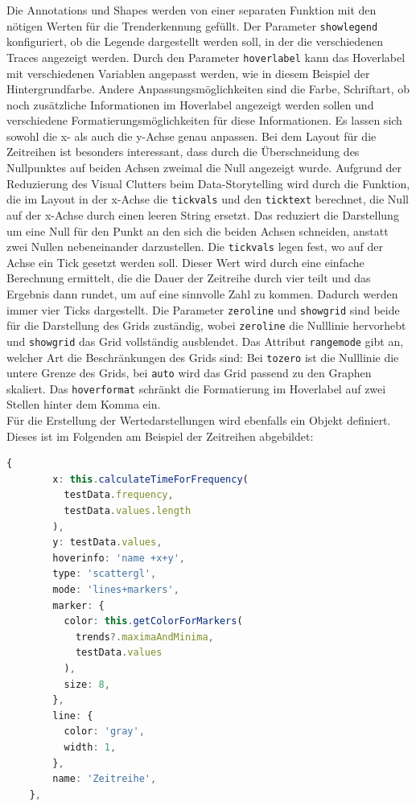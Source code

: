 Die Annotations und Shapes werden von einer separaten Funktion mit den nötigen Werten für die Trenderkennung gefüllt. Der Parameter \texttt{showlegend} konfiguriert, ob die Legende dargestellt werden soll, in der die verschiedenen Traces angezeigt werden. Durch den Parameter \texttt{hoverlabel} kann das Hoverlabel mit verschiedenen Variablen angepasst werden, wie in diesem Beispiel der Hintergrundfarbe. Andere Anpassungsmöglichkeiten sind die Farbe, Schriftart, ob noch zusätzliche Informationen im Hoverlabel angezeigt werden sollen und verschiedene Formatierungsmöglichkeiten für diese Informationen. Es lassen sich sowohl die x- als auch die y-Achse genau anpassen. Bei dem Layout für die Zeitreihen ist besonders interessant, dass durch die Überschneidung des Nullpunktes auf beiden Achsen zweimal die Null angezeigt wurde. Aufgrund der Reduzierung des Visual Clutters beim Data-Storytelling wird durch die Funktion, die im Layout in der x-Achse die \texttt{tickvals} und den \texttt{ticktext} berechnet, die Null auf der x-Achse durch einen leeren String ersetzt. Das reduziert die Darstellung um eine Null für den Punkt an den sich die beiden Achsen schneiden, anstatt zwei Nullen nebeneinander darzustellen. Die \texttt{tickvals} legen fest, wo auf der Achse ein Tick gesetzt werden soll. Dieser Wert wird durch eine einfache Berechnung ermittelt, die die Dauer der Zeitreihe durch vier teilt und das Ergebnis dann rundet, um auf eine sinnvolle Zahl zu kommen. Dadurch werden immer vier Ticks dargestellt. Die Parameter \texttt{zeroline} und \texttt{showgrid} sind beide für die Darstellung des Grids zuständig, wobei \texttt{zeroline} die Nulllinie hervorhebt und \texttt{showgrid} das Grid vollständig ausblendet. Das Attribut \texttt{rangemode} gibt an, welcher Art die Beschränkungen des Grids sind: Bei \texttt{tozero} ist die Nulllinie die untere Grenze des Grids, bei \texttt{auto} wird das Grid passend zu den Graphen skaliert. Das \texttt{hoverformat} schränkt die Formatierung im Hoverlabel auf zwei Stellen hinter dem Komma ein.\\ Für die Erstellung der Wertedarstellungen wird ebenfalls ein Objekt definiert. Dieses ist im Folgenden am Beispiel der Zeitreihen abgebildet:
\begin{lstlisting}[language=Typescript]
    {
        x: this.calculateTimeForFrequency(
          testData.frequency,
          testData.values.length
        ),
        y: testData.values,
        hoverinfo: 'name +x+y',
        type: 'scattergl',
        mode: 'lines+markers',
        marker: {
          color: this.getColorForMarkers(
            trends?.maximaAndMinima,
            testData.values
          ),
          size: 8,
        },
        line: {
          color: 'gray',
          width: 1,
        },
        name: 'Zeitreihe',
    },
\end{lstlisting}
